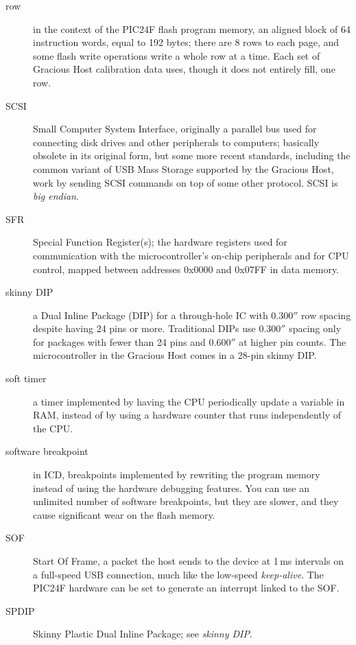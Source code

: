 \begin{description}
\item[row] in the context of the PIC24F flash program memory, an aligned
block of 64 instruction words, equal to 192 bytes; there are 8 rows to
each page, and some flash write operations write a whole row at a time. 
Each set of Gracious Host calibration data uses, though it does not entirely
fill, one row.

\item[SCSI] Small Computer System Interface, originally a parallel bus used
for connecting disk drives and other peripherals to computers; basically
obsolete in its original form, but some more recent standards, including the
common variant of USB Mass Storage supported by the Gracious Host, work by
sending SCSI commands on top of some other protocol.  SCSI is \emph{big
endian}.

\item[SFR] Special Function Register(s); the hardware registers used for
communication with the microcontroller's on-chip peripherals and for CPU
control, mapped between addresses 0x0000 and 0x07FF in data memory.

\item[skinny DIP] a Dual Inline Package (DIP) for a through-hole IC with
0.300$''$ row spacing despite having 24 pins or more.  Traditional DIPs use
0.300$''$ spacing only for packages with fewer than 24 pins and 0.600$''$ at
higher pin counts.  The microcontroller in the Gracious Host comes in a
28-pin skinny DIP.

\item[soft timer] a timer implemented by having the CPU periodically update
a variable in RAM, instead of by using a hardware counter that runs
independently of the CPU.

\item[software breakpoint] in ICD, breakpoints implemented by rewriting the
program memory instead of using the hardware debugging features.  You can
use an unlimited number of software breakpoints, but they are slower, and
they cause significant wear on the flash memory.

\item[SOF] Start Of Frame, a packet the host sends to the device at
1\,ms intervals on a full-speed USB connection, much like the low-speed
\emph{keep-alive}.  The PIC24F hardware can
be set to generate an interrupt linked to the SOF.

\item[SPDIP] Skinny Plastic Dual Inline Package; see \emph{skinny DIP}.


\end{description}
